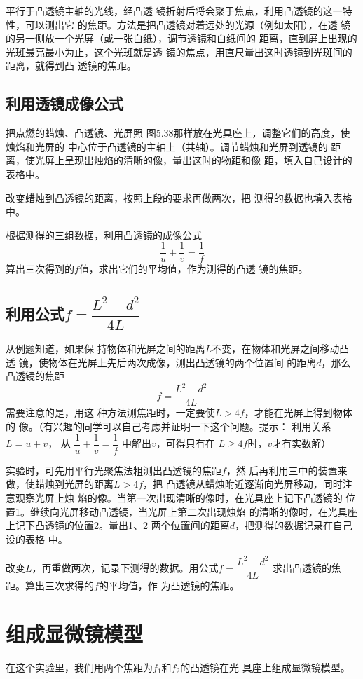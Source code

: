 平行于凸透镜主轴的光线，经凸透
镜折射后将会聚于焦点，利用凸透镜的这一特性，可以测出它
的焦距。方法是把凸透镜对着远处的光源（例如太阳），在透
镜的另一侧放一个光屏（或一张白纸），调节透镜和白纸间的
距离，直到屏上出现的光斑最亮最小为止，这个光斑就是透
镜的焦点，用直尺量出这时透镜到光斑间的距离，就得到凸
透镜的焦距。

\subsection{利用透镜成像公式}

把点燃的蜡烛、凸透镜、光屏照
图5.38那样放在光具座上，调整它们的高度，使烛焰和光屏的
中心位于凸透镜的主轴上（共轴）。调节蜡烛和光屏到透镜的
距离，使光屏上呈现出烛焰的清晰的像，量出这时的物距和像
距，填入自己设计的表格中。

改变蜡烛到凸透镜的距离，按照上段的要求再做两次，把
测得的数据也填入表格中。

根据测得的三组数据，利用凸透镜的成像公式
\[\frac{1}{u}+\frac{1}{v}=\frac{1}{f} \]
算出三次得到的$f$值，求出它们的平均值，作为测得的凸透
镜的焦距。

\subsection{利用公式$f=\dfrac{L^2-d^2}{4L}$}

从例题知道，如果保
持物体和光屏之间的距离$L$不变，在物体和光屏之间移动凸透
镜，使物体在光屏上先后两次成像，测出凸透镜的两个位置间
的距离$d$，那么凸透镜的焦距
\[f=\dfrac{L^2-d^2}{4L} \]
需要注意的是，用这
种方法测焦距时，一定要使$L>4f$，才能在光屏上得到物体的
像。（有兴趣的同学可以自己考虑并证明一下这个问题。提示：
利用关系$L=u+v$，
从
$\dfrac{1}{u}+\dfrac{1}{v}=\dfrac{1}{f} $
中解出$v$，可得只有在
$L\ge 4f$时，$v$才有实数解）

实验时，可先用平行光聚焦法粗测出凸透镜的焦距$f$，然
后再利用三中的装置来做，使蜡烛到光屏的距离$L>4f$，把
凸透镜从蜡烛附近逐渐向光屏移动，同时注意观察光屏上烛
焰的像。当第一次出现清晰的像时，在光具座上记下凸透镜的
位置1。继续向光屏移动凸透镜，当光屏上第二次出现烛焰
的清晰的像时，在光具座上记下凸透镜的位置2。量出1、2
两个位置间的距离$d$，把测得的数据记录在自己设的表格
中。

改变$L$，再重做两次，记录下测得的数据。用公式$f=\dfrac{L^2-d^2}{4L}$
求出凸透镜的焦距。算出三次求得的$f$的平均值，作
为凸透镜的焦距。

\section{组成显微镜模型}
在这个实验里，我们用两个焦距为$f_1$和$f_2$的凸透镜在光
具座上组成显微镜模型。

